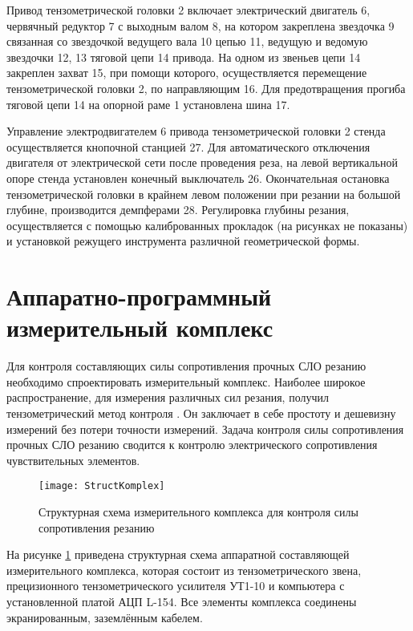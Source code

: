 Привод тензометрической головки 2 включает электрический двигатель 6, червячный редуктор 7 с выходным валом 8, на котором закреплена звездочка 9 связанная со звездочкой ведущего вала 10 цепью 11, ведущую и ведомую звездочки 12, 13 тяговой цепи 14 привода. На одном из звеньев цепи 14 закреплен захват 15, при помощи которого, осуществляется перемещение тензометрической головки 2, по направляющим 16. Для предотвращения прогиба тяговой цепи 14 на опорной раме 1 установлена шина 17.

Управление электродвигателем 6 привода тензометрической головки 2 стенда осуществляется кнопочной станцией 27. Для автоматического отключения двигателя от электрической сети после проведения реза, на левой вертикальной опоре стенда установлен конечный выключатель 26. Окончательная остановка тензометрической головки в крайнем левом положении при резании на большой глубине, производится демпферами 28. Регулировка глубины резания, осуществляется с помощью калиброванных прокладок (на рисунках не показаны) и установкой режущего инструмента различной геометрической формы.

\section{Аппаратно-программный измерительный комплекс}\label{sect2_4}

Для контроля составляющих силы сопротивления прочных СЛО резанию необходимо спроектировать измерительный комплекс. Наиболее широкое распространение, для измерения различных сил резания, получил тензометрический метод контроля \todo{[ссылки]}. Он заключает в себе простоту и дешевизну измерений без потери точности измерений. Задача контроля силы сопротивления прочных СЛО резанию сводится к контролю электрического сопротивления чувствительных элементов.

\begin{figure} [htbp]
	\center
	\texttt{[image: StructKomplex]}
	\caption{Структурная схема измерительного комплекса для контроля силы сопротивления резанию} 
	\label{img:StructKomplex}  
\end{figure}

На рисунке \ref{img:StructKomplex} приведена структурная схема аппаратной составляющей измерительного комплекса, которая состоит из тензометрического звена, прецизионного тензометрического усилителя УТ1-10 и компьютера с установленной платой АЦП L-154. Все элементы комплекса соединены экранированным, заземлённым кабелем.

